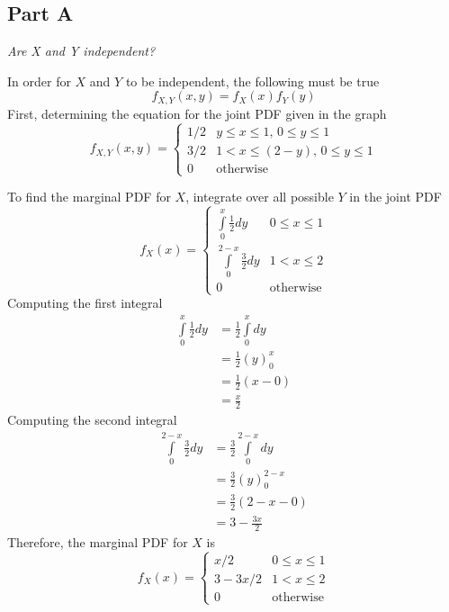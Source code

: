 \documentclass{article}
\begin{document}
\subsection*{Part A}

\textit{Are X and Y independent?}

\bigbreak

In order for $X$ and $Y$ to be independent, the following must be true
$$ f_{X,Y}(x,y) = f_X(x) f_Y(y) $$
First, determining the equation for the joint PDF given in the graph
$$ f_{X,Y}(x,y) = \begin{cases}
    1/2 & y \leq x \leq 1,\, 0 \leq y \leq 1 \\
    3/2 & 1 < x \leq (2 - y),\, 0 \leq y \leq 1 \\
    0 & \mathrm{otherwise}
\end{cases} $$

To find the marginal PDF for $X$, integrate over all possible $Y$ in the
joint PDF
$$ f_X(x) = \begin{cases}
    \int\limits_0^{x} \frac{1}{2} dy & 0 \leq x \leq 1 \\
    \int\limits_0^{2 - x} \frac{3}{2} dy & 1 < x \leq 2 \\
    0 & \mathrm{otherwise}
\end{cases} $$
Computing the first integral
\begin{align*}
    \int\limits_0^x \frac{1}{2} dy &= \frac{1}{2} \int\limits_0^x dy \\
    &= \frac{1}{2} \left( y \right)_0^x \\
    &= \frac{1}{2} \left( x - 0 \right) \\
    &= \frac{x}{2}
\end{align*}
Computing the second integral
\begin{align*}
    \int\limits_0^{2 - x} \frac{3}{2} dy &= \frac{3}{2} \int\limits_0^{2 - x} dy \\
    &= \frac{3}{2} \left( y \right)_0^{2 - x} \\
    &= \frac{3}{2} \left(2 - x - 0 \right) \\
    &= 3 - \frac{3x}{2}
\end{align*}
Therefore, the marginal PDF for $X$ is
$$ f_X(x) = \begin{cases}
    x / 2 & 0 \leq x \leq 1 \\
    3 - 3x / 2 & 1 < x \leq 2 \\
    0 & \mathrm{otherwise}
\end{cases} $$
\end{document}

